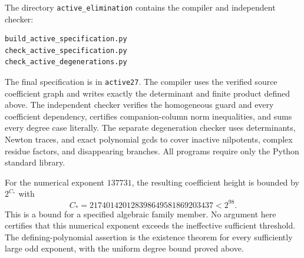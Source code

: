 \documentclass[11pt,a4paper]{article}
\begin{document}
The directory \texttt{active\_elimination} contains the compiler and
independent checker:
\begin{verbatim}
build_active_specification.py
check_active_specification.py
check_active_degenerations.py
\end{verbatim}
The final specification is in \texttt{active27}. The compiler uses the verified source
coefficient graph and writes exactly the determinant and finite product
defined above. The independent checker verifies the homogeneous guard and every
coefficient dependency, certifies companion-column norm inequalities,
and sums every degree case literally. The separate degeneration checker
uses determinants, Newton traces, and exact polynomial gcds to cover
inactive nilpotents, complex residue factors, and disappearing branches.
All programs require only the Python standard library.

For the numerical exponent $137731$, the resulting coefficient height
is bounded by $2^{C_*}$ with
\[
 C_*=217401420128398649581869203437<2^{98}.
\]
This is a bound for a specified algebraic family member. No argument
here certifies that this numerical exponent exceeds the ineffective
sufficient threshold. The defining-polynomial assertion is the
existence theorem for every sufficiently large odd exponent, with
the uniform degree bound proved above.
\end{document}
